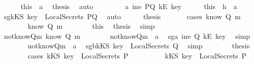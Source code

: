\begin{isabellebody}
\ \ \ \ \isamarkupfalse%
\ this\ \ a{}\ \isamarkupfalse%
\ {\isacharquery}thesis\ \isamarkupfalse%
\ auto\isanewline
\ \ \isamarkupfalse%
\isanewline
\ \ \ \ \isamarkupfalse%
\ a{}{}{\isacharcolon}{\isachardoublequoteopen}{\isasymnot}\ ine\ PQ\ {\isacharparenleft}kE\ key{\isacharparenright}{\isachardoublequoteclose}\isanewline
\ \ \ \ \isamarkupfalse%
\ this\ \ h{}\ \ a{}\ \isamarkupfalse%
\ sg{}{\isacharcolon}{\isachardoublequoteopen}kKS\ key\ {\isasymin}\ LocalSecrets\ PQ{\isachardoublequoteclose}\ \isamarkupfalse%
\ auto\isanewline
\ \ \ \ \isamarkupfalse%
\ {\isacharquery}thesis\ \isanewline
\ \ \ \ \isamarkupfalse%
\ {\isacharparenleft}cases\ {\isachardoublequoteopen}know\ Q\ m{\isachardoublequoteclose}{\isacharparenright}\isanewline
\ \ \ \ \ \ \isamarkupfalse%
\ {\isachardoublequoteopen}know\ Q\ m{\isachardoublequoteclose}\isanewline
\ \ \ \ \ \ \isamarkupfalse%
\ this\ \isamarkupfalse%
\ {\isacharquery}thesis\ \isamarkupfalse%
\ simp\isanewline
\ \ \ \ \isamarkupfalse%
\ \isanewline
\ \ \ \ \ \ \isamarkupfalse%
\ not{\isacharunderscore}knowQm{\isacharcolon}{\isachardoublequoteopen}{\isasymnot}\ know\ Q\ m{\isachardoublequoteclose}\isanewline
\ \ \ \ \ \ \isamarkupfalse%
\ not{\isacharunderscore}knowQm\ \ a{}\ \isamarkupfalse%
\ sg{}a{\isacharcolon}{\isachardoublequoteopen}{\isasymnot}\ ine\ Q\ {\isacharparenleft}kE\ key{\isacharparenright}{\isachardoublequoteclose}\ \isamarkupfalse%
\ simp\isanewline
\ \ \ \ \ \ \isamarkupfalse%
\ not{\isacharunderscore}knowQm\ \ a{}\ \isamarkupfalse%
\ sg{}b{\isacharcolon}{\isachardoublequoteopen}kKS\ key\ {\isasymnotin}\ LocalSecrets\ Q{\isachardoublequoteclose}\ \isamarkupfalse%
\ simp\isanewline
\ \ \ \ \ \ \isamarkupfalse%
\ {\isacharquery}thesis\isanewline
\ \ \ \ \ \ \isamarkupfalse%
\ {\isacharparenleft}cases\ {\isachardoublequoteopen}kKS\ key\ {\isasymin}\ LocalSecrets\ P{\isachardoublequoteclose}{\isacharparenright}\isanewline
\ \ \ \ \ \ \ \ \isamarkupfalse%
\ {\isachardoublequoteopen}kKS\ key\ {\isasymin}\ LocalSecrets\ P{\isachardoublequoteclose}\isanewline

\end{isabellebody}
